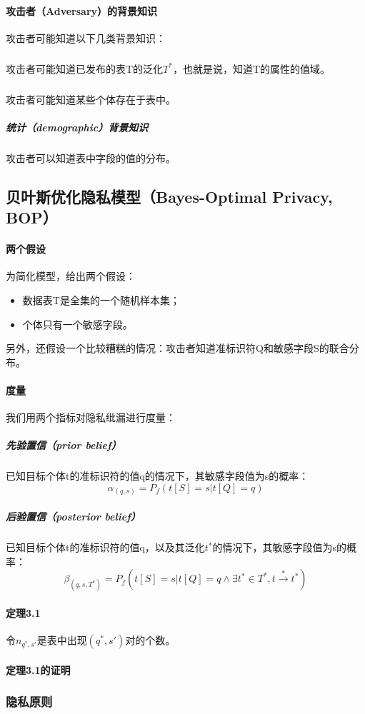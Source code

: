 \documentclass[12pt,a4paper]{article}
\begin{document}
\paragraph{攻击者（Adversary）的背景知识} 攻击者可能知道以下几类背景知识：
	\subparagraph{} 攻击者可能知道已发布的表T的泛化$T^*$，也就是说，知道T的属性的值域。
	\subparagraph{} 攻击者可能知道某些个体存在于表中。
	\subparagraph{统计（demographic）背景知识} 攻击者可以知道表中字段的值的分布。

\subsection{贝叶斯优化隐私模型（Bayes-Optimal Privacy, BOP）}
\paragraph{两个假设} 为简化模型，给出两个假设：
\begin{itemize}
	\item 数据表T是全集的一个随机样本集；
	\item 个体只有一个敏感字段。
\end{itemize}
另外，还假设一个比较糟糕的情况：攻击者知道准标识符Q和敏感字段S的联合分布。
\paragraph{度量} 我们用两个指标对隐私纰漏进行度量：
	\subparagraph{先验置信（prior belief）} 已知目标个体t的准标识符的值q的情况下，其敏感字段值为s的概率：
	\begin{equation}
		\alpha_{(q,s)} = P_f(t[S]=s|t[Q]=q)
	\end{equation}

	\subparagraph{后验置信（posterior belief）} 已知目标个体t的准标识符的值q，以及其泛化$t^*$的情况下，其敏感字段值为s的概率：
	\begin{equation}
		\beta_{(q,s,T^*)}=P_f(t[S]=s|t[Q]=q \wedge \exists t^* \in T^*, t \overset{*}{\rightarrow}t^* )
	\end{equation}
\paragraph{定理3.1} 令$n_{q^*,s'}$是表中出现$(q^*, s')$对的个数。

\paragraph{定理3.1的证明}

\subsubsection{隐私原则}
\end{document}

